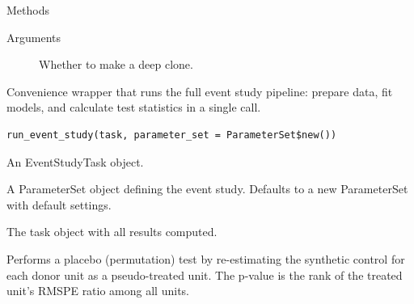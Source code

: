 \documentclass[a4paper]{book}
\begin{document}
\begin{Section}{Methods}
\begin{SubSection}{}

%
\begin{SubSubSection}{Arguments}

\begin{description}

\item[] Whether to make a deep clone.

\end{description}



\end{SubSubSection}

\end{SubSection}


\end{Section}
%
\begin{Description}
Convenience wrapper that runs the full event study pipeline: prepare data,
fit models, and calculate test statistics in a single call.
\end{Description}
%
\begin{Usage}
\begin{verbatim}
run_event_study(task, parameter_set = ParameterSet$new())
\end{verbatim}
\end{Usage}
%
\begin{Arguments}
\begin{ldescription}
\item[\code{task}] An EventStudyTask object.

\item[\code{parameter\_set}] A ParameterSet object defining the event study.
Defaults to a new ParameterSet with default settings.
\end{ldescription}
\end{Arguments}
%
\begin{Value}
The task object with all results computed.
\end{Value}
%
\begin{Description}
Performs a placebo (permutation) test by re-estimating the synthetic
control for each donor unit as a pseudo-treated unit. The p-value is
the rank of the treated unit's RMSPE ratio among all units.
\end{Description}
\end{document}
